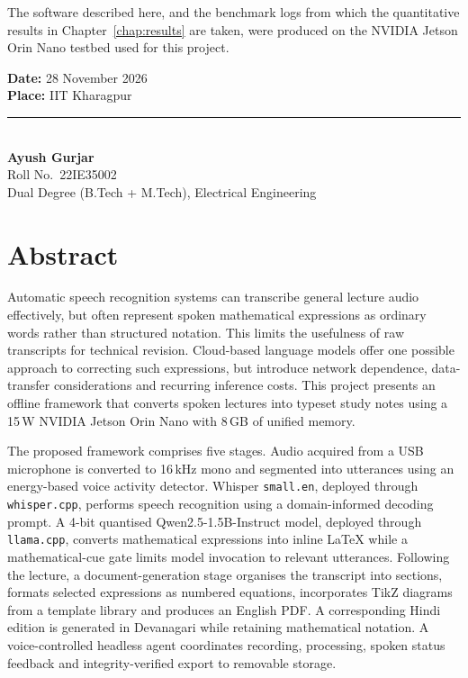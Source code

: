 \documentclass[11pt,a4paper,oneside]{report}
\theoremstyle{definition}
\begin{document}
The software described here, and the benchmark logs from which the quantitative results in Chapter~\ref{chap:results} are taken, were produced on the NVIDIA Jetson Orin Nano testbed used for this project.

\vspace{18mm}
\noindent
\begin{minipage}[t]{0.48\textwidth}
\textbf{Date:} 28 November 2026\\[3pt]
\textbf{Place:} IIT Kharagpur
\end{minipage}\hfill
\begin{minipage}[t]{0.46\textwidth}
\rule{60mm}{0.4pt}\\[3pt]
\textbf{Ayush Gurjar}\\
Roll No.\ 22IE35002\\
Dual Degree (B.Tech + M.Tech), Electrical Engineering
\end{minipage}



\chapter*{Abstract}
\thispagestyle{plain}

Automatic speech recognition systems can transcribe general lecture audio effectively, but often represent spoken mathematical expressions as ordinary words rather than structured notation. This limits the usefulness of raw transcripts for technical revision. Cloud-based language models offer one possible approach to correcting such expressions, but introduce network dependence, data-transfer considerations and recurring inference costs. This project presents an offline framework that converts spoken lectures into typeset study notes using a 15\,W NVIDIA Jetson Orin Nano with 8\,GB of unified memory.

The proposed framework comprises five stages. Audio acquired from a USB microphone is converted to 16\,kHz mono and segmented into utterances using an energy-based voice activity detector. Whisper \texttt{small.en}, deployed through \texttt{whisper.cpp}, performs speech recognition using a domain-informed decoding prompt. A 4-bit quantised Qwen2.5-1.5B-Instruct model, deployed through \texttt{llama.cpp}, converts mathematical expressions into inline LaTeX while a mathematical-cue gate limits model invocation to relevant utterances. Following the lecture, a document-generation stage organises the transcript into sections, formats selected expressions as numbered equations, incorporates TikZ diagrams from a template library and produces an English PDF. A corresponding Hindi edition is generated in Devanagari while retaining mathematical notation. A voice-controlled headless agent coordinates recording, processing, spoken status feedback and integrity-verified export to removable storage.
\end{document}
